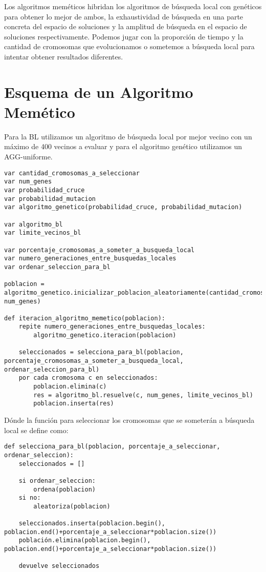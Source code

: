 Los algoritmos meméticos hibridan los algoritmos de búsqueda local con genéticos para obtener
lo mejor de ambos, la exhaustividad de búsqueda en una parte concreta del espacio de soluciones
y la amplitud de búsqueda en el espacio de soluciones respectivamente. Podemos jugar con la
proporción de tiempo y la cantidad de cromosomas que evolucionamos o sometemos a búsqueda local
para intentar obtener resultados diferentes.

\section{Esquema de un Algoritmo Memético}

Para la BL utilizamos un algoritmo de búsqueda local por mejor vecino con un máximo de 400 vecinos a evaluar
y para el algoritmo genético utilizamos un AGG-uniforme.

\begin{minipage}{\textwidth}
\begin{lstlisting}[mathescape=true,caption={Esquema general de un algoritmo memético.},captionpos=b]
var cantidad_cromosomas_a_seleccionar
var num_genes
var probabilidad_cruce
var probabilidad_mutacion
var algoritmo_genetico(probabilidad_cruce, probabilidad_mutacion)

var algoritmo_bl
var limite_vecinos_bl

var porcentaje_cromosomas_a_someter_a_busqueda_local
var numero_generaciones_entre_busquedas_locales
var ordenar_seleccion_para_bl

poblacion =
algoritmo_genetico.inicializar_poblacion_aleatoriamente(cantidad_cromosomas, num_genes)

def iteracion_algoritmo_memetico(poblacion):
	repite numero_generaciones_entre_busquedas_locales:
		algoritmo_genetico.iteracion(poblacion)

	seleccionados = selecciona_para_bl(poblacion, porcentaje_cromosomas_a_someter_a_busqueda_local, ordenar_seleccion_para_bl)
	por cada cromosoma c en seleccionados:
		poblacion.elimina(c)
		res = algoritmo_bl.resuelve(c, num_genes, limite_vecinos_bl)
		poblacion.inserta(res)
\end{lstlisting}
\end{minipage}

Dónde la función para seleccionar los cromosomas que se someterán a búsqueda local se define como:

\begin{minipage}{\textwidth}
\begin{lstlisting}[mathescape=true,caption={Definición de la función selecciona\_para\_bl.},captionpos=b]
def selecciona_para_bl(poblacion, porcentaje_a_seleccionar, ordenar_seleccion):
	seleccionados = []

	si ordenar_seleccion:
		ordena(poblacion)
	si no:
		aleatoriza(poblacion)
	
	seleccionados.inserta(poblacion.begin(), poblacion.end()+porcentaje_a_seleccionar*poblacion.size())
	población.elimina(poblacion.begin(), poblacion.end()+porcentaje_a_seleccionar*poblacion.size())

	devuelve seleccionados
\end{lstlisting}
\end{minipage}